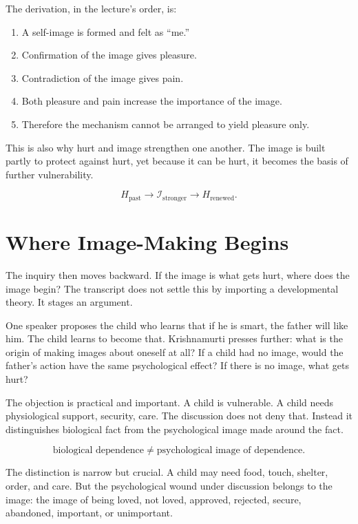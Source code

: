 The derivation, in the lecture's order, is:

\begin{enumerate}
\item A self-image is formed and felt as ``me.''
\item Confirmation of the image gives pleasure.
\item Contradiction of the image gives pain.
\item Both pleasure and pain increase the importance of the image.
\item Therefore the mechanism cannot be arranged to yield pleasure only.
\end{enumerate}

This is also why hurt and image strengthen one another. The image is built partly to protect against hurt, yet because it can be hurt, it becomes the basis of further vulnerability.

\begin{equation}
H_{\text{past}} \to \mathcal{I}_{\text{stronger}} \to H_{\text{renewed}}.
\end{equation}

\section{Where Image-Making Begins}

The inquiry then moves backward. If the image is what gets hurt, where does the image begin? The transcript does not settle this by importing a developmental theory. It stages an argument.

One speaker proposes the child who learns that if he is smart, the father will like him. The child learns to become that. Krishnamurti presses further: what is the origin of making images about oneself at all? If a child had no image, would the father's action have the same psychological effect? If there is no image, what gets hurt?

The objection is practical and important. A child is vulnerable. A child needs physiological support, security, care. The discussion does not deny that. Instead it distinguishes biological fact from the psychological image made around the fact.

\begin{equation}
\text{biological dependence}
\neq
\text{psychological image of dependence}.
\end{equation}

The distinction is narrow but crucial. A child may need food, touch, shelter, order, and care. But the psychological wound under discussion belongs to the image: the image of being loved, not loved, approved, rejected, secure, abandoned, important, or unimportant.

